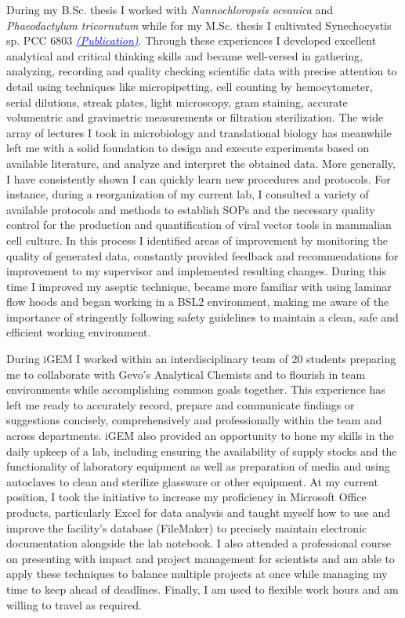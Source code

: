 \documentclass[11pt,a4paper,sans]{moderncv}
\begin{document}
\begin{spacing}{1.15}
During my B.Sc. thesis I worked with \textit{Nannochloropsis oceanica} and \textit{Phaeodactylum tricornutum} while for my M.Sc. thesis I cultivated Synechocystis sp. PCC 6803 {\href{https://www.ncbi.nlm.nih.gov/pubmed/29517395}{\textcolor{blue}{{\textit{(Publication)}}}}}. Through these experiences I developed excellent analytical and critical thinking skills and became well-versed in gathering, analyzing, recording and quality checking scientific data with precise attention to detail using techniques like micropipetting, cell counting by hemocytometer, serial dilutions, streak plates, light microscopy, gram staining, accurate volumentric and gravimetric measurements or filtration sterilization. The wide array of lectures I took in microbiology and translational biology has meanwhile left me with a solid foundation to design and execute experiments based on available literature, and analyze and interpret the obtained data. More generally, I have consistently shown I can quickly learn new procedures and protocols. For instance, during a reorganization of my current lab, I consulted a variety of available protocols and methods to establish SOPs and the necessary quality control for the production and quantification of viral vector tools in mammalian cell culture. In this process I identified areas of improvement by monitoring the quality of generated data, constantly provided feedback and recommendations for improvement to my supervisor and implemented resulting changes. During this time I improved my aseptic technique, became more familiar with using laminar flow hoods and began working in a BSL2 environment, making me aware of the importance of stringently following safety guidelines to maintain a clean, safe and efficient working environment. \par\vspace*{2mm} 
 
During iGEM I worked within an interdisciplinary team of 20 students preparing me to collaborate with Gevo's Analytical Chemists and to flourish in team environments while accomplishing common goals together. This experience has left me ready to accurately record, prepare and communicate findings or suggestions concisely, comprehensively and professionally within the team and across departments. iGEM also provided an opportunity to hone my skills in the daily upkeep of a lab, including ensuring the availability of supply stocks and the functionality of laboratory equipment as well as preparation of media and using autoclaves to clean and sterilize glassware or other equipment. At my current position, I took the initiative to increase my proficiency in Microsoft Office products, particularly Excel for data analysis and taught myself how to use and improve the facility's database (FileMaker) to precisely maintain electronic documentation alongside the lab notebook. I also attended a professional course on presenting with impact and project management for scientists and am able to apply these techniques to balance multiple projects at once while managing my time to keep ahead of deadlines. Finally, I am used to flexible work hours and am willing to travel as required.\par\vspace*{2mm}


\end{spacing}
\end{document}
